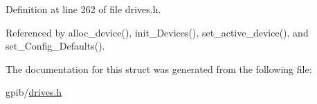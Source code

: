 Definition at line 262 of file drives.\+h.



Referenced by alloc\+\_\+device(), init\+\_\+\+Devices(), set\+\_\+active\+\_\+device(), and set\+\_\+\+Config\+\_\+\+Defaults().



The documentation for this struct was generated from the following file\+:\begin{DoxyCompactItemize}
\item 
gpib/\hyperlink{drives_8h}{drives.\+h}\end{DoxyCompactItemize}
